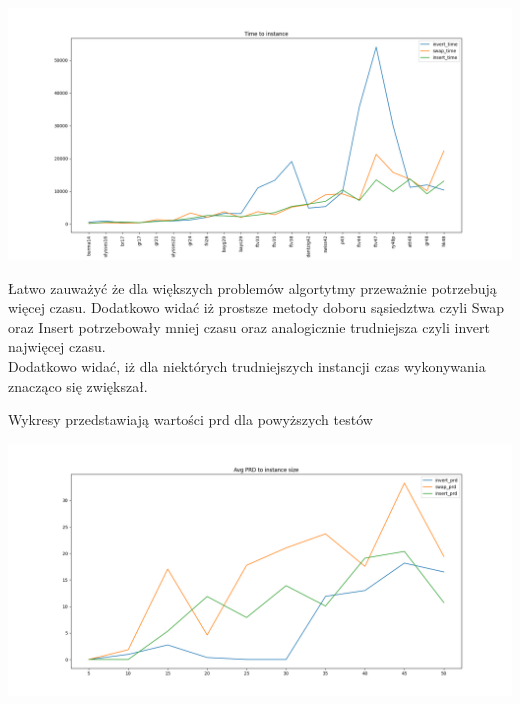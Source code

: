 \documentclass{article}
\begin{document}
\begin{adjustwidth}{-5cm}{-5cm}
  \begin{center}
    \includegraphics[scale=0.45]{time.png}
  \end{center}
\end{adjustwidth}

Łatwo zauważyć że dla większych problemów algortytmy przeważnie potrzebują
więcej czasu. Dodatkowo widać iż prostsze metody doboru sąsiedztwa czyli
Swap oraz Insert potrzebowały mniej czasu oraz analogicznie trudniejsza czyli invert
najwięcej czasu.\\
Dodatkowo widać, iż dla niektórych trudniejszych instancji czas wykonywania znacząco
się zwiększał.

\newpage

Wykresy przedstawiają wartości prd dla powyższych testów
\begin{adjustwidth}{-5cm}{-5cm}
  \begin{center}
    \includegraphics[scale=0.45]{rand_prd.png}
  \end{center}
\end{adjustwidth}
\end{document}
